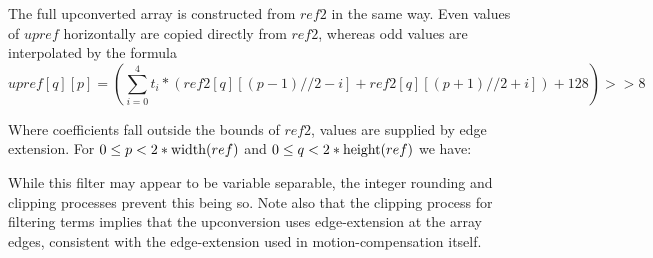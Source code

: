 The full upconverted array is constructed from $ref2$ in the same way.
Even values of $upref$ horizontally are copied directly from $ref2$, whereas
odd values are interpolated by the formula
\[
upref[q][p]=  \left(\sum_{i=0}^{4} t_i *
\left(
 ref2[q][(p-1)//2-i]
+ref2[q][(p+1)//2+i]
\right)+128 \right)>>8
\]

Where coefficients fall outside the bounds of $ref2$, values
are supplied by edge extension.
For $0\leq p<2*\operatorname{width}(ref)$ and $0\leq q<2*\operatorname{height}(ref)$ we have:

\begin{pseudo*}
\bsELSE
  \bsEND
\bsEND
\end{pseudo*}

\begin{informative}
While this filter may appear to be variable separable, the integer rounding and 
clipping processes prevent this being so. Note also that the clipping process for
filtering terms implies that the upconversion uses edge-extension at the array
edges, consistent with the edge-extension used in motion-compensation itself.
\end{informative}


